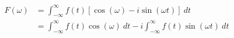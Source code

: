 \documentclass[preview]{standalone}
\begin{document}
\begin{align*}
F(\omega)&=\int_{-\infty}^{\infty}f(t)[\cos({\omega})-i\sin({\omega t})] \ dt \\ &=\int_{-\infty}^{\infty}f(t)\cos({\omega}) \ dt-i\int_{-\infty}^{\infty}f(t)\sin({\omega t}) \ dt
\end{align*}
\end{document}
